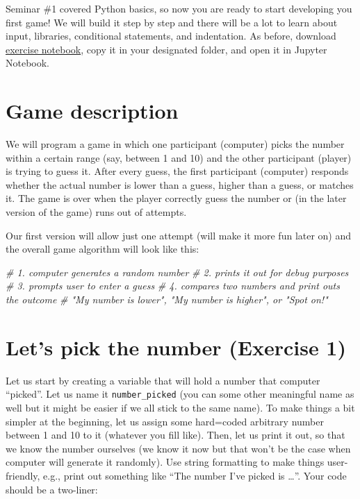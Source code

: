 \documentclass[
]{book}
\newenvironment{Shaded}{\begin{snugshade}}{\end{snugshade}}
\newcommand{\CommentTok}[1]{\textcolor[rgb]{0.56,0.35,0.01}{\textit{#1}}}
\begin{document}
Seminar \#1 covered Python basics, so now you are ready to start developing you first game! We will build it step by step and there will be a lot to learn about input, libraries, conditional statements, and indentation. As before, download \href{notebooks/Seminar\%2002.\%20Guess\%20the\%20number.ipynb}{exercise notebook}, copy it in your designated folder, and open it in Jupyter Notebook.

\hypertarget{game-description}{%
\section{Game description}\label{game-description}}

We will program a game in which one participant (computer) picks the number within a certain range (say, between 1 and 10) and the other participant (player) is trying to guess it. After every guess, the first participant (computer) responds whether the actual number is lower than a guess, higher than a guess, or matches it. The game is over when the player correctly guess the number or (in the later version of the game) runs out of attempts.

Our first version will allow just one attempt (will make it more fun later on) and the overall game algorithm will look like this:

\begin{Shaded}
\begin{Highlighting}[]
\CommentTok{\# 1. computer generates a random number}
\CommentTok{\# 2. prints it out for debug purposes}
\CommentTok{\# 3. prompts user to enter a guess}
\CommentTok{\# 4. compares two numbers and print outs the outcome}
\CommentTok{\#    "My number is lower", "My number is higher", or "Spot on!"}
\end{Highlighting}
\end{Shaded}

\hypertarget{lets-pick-the-number-exercise-1}{%
\section{Let's pick the number (Exercise 1)}\label{lets-pick-the-number-exercise-1}}

Let us start by creating a variable that will hold a number that computer ``picked''. Let us name it \texttt{number\_picked} (you can some other meaningful name as well but it might be easier if we all stick to the same name). To make things a bit simpler at the beginning, let us assign some hard=coded arbitrary number between 1 and 10 to it (whatever you fill like). Then, let us print it out, so that we know the number ourselves (we know it now but that won't be the case when computer will generate it randomly). Use string formatting to make things user-friendly, e.g., print out something like ``The number I've picked is \ldots{}''. Your code should be a two-liner:
\end{document}
